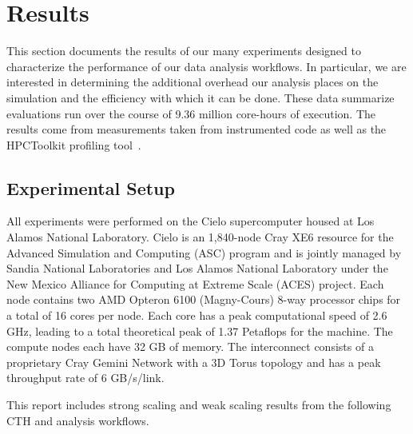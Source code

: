 \section{Results}
\label{sec:Results}

This section documents the results of our many experiments designed to
characterize the performance of our data analysis workflows.  In
particular, we are interested in determining the additional overhead our
analysis places on the simulation and the efficiency with which it can be
done.  These data summarize evaluations run over the course of 9.36 million
core-hours of execution.  The results come from measurements taken from
instrumented code as well as the HPCToolkit profiling
tool~\cite{adhianto:hpctoolkit}.

\subsection{Experimental Setup}

All experiments were performed on the Cielo supercomputer housed at Los Alamos
National Laboratory.  Cielo is an 1,840-node Cray XE6 resource for the Advanced
Simulation and Computing (ASC) program and is jointly managed by Sandia National
Laboratories and Los Alamos National Laboratory under the New Mexico
Alliance for Computing at Extreme Scale (ACES) project.  Each node contains
two AMD Opteron 6100 (Magny-Cours) 8-way processor chips for a total of 16 cores
per node.  Each core has a peak computational speed of 2.6 GHz, leading to a total
theoretical peak of 1.37 Petaflops for the machine. The compute nodes each
have 32 GB of memory.  The interconnect consists of a proprietary Cray Gemini
Network with a 3D Torus topology and has a peak throughput rate of 6 GB/s/link.

This report includes strong scaling and weak scaling results from the
following CTH and analysis workflows.

